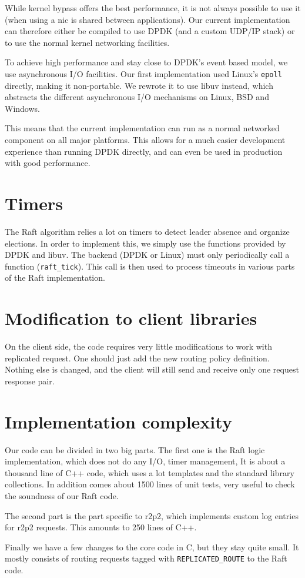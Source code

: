 While kernel bypass offers the best performance, it is not always possible to use it (\ie when using a \gls{nic} is shared between applications).
Our current implementation can therefore either be compiled to use DPDK (and a custom UDP/IP stack) or to use the normal kernel networking facilities.

To achieve high performance and stay close to DPDK's event based model, we use asynchronous I/O facilities.
Our first implementation used Linux's \texttt{epoll} directly, making it non-portable.
We rewrote it to use libuv\cite{libuv} instead, which abstracts the different asynchronous I/O mechanisms on Linux, BSD and Windows.

This means that the current implementation can run as a normal networked component on all major platforms.
This allows for a much easier development experience than running DPDK directly, and can even be used in production with good performance.

\section{Timers}

The Raft algorithm relies a lot on timers to detect leader absence and organize elections.
In order to implement this, we simply use the functions provided by DPDK and libuv.
The backend (DPDK or Linux) must only periodically call a function (\texttt{raft\_tick}).
This call is then used to process timeouts in various parts of the Raft implementation.

\section{Modification to client libraries}

On the client side, the code requires very little modifications to work with replicated request.
One should just add the new routing policy definition.
Nothing else is changed, and the client will still send and receive only one request response pair.


\section{Implementation complexity}

Our code can be divided in two big parts.
The first one is the Raft logic implementation, which does not do any I/O, timer management, \etc
It is about a thousand line of C++ code, which uses a lot templates and the standard library collections.
In addition comes about 1500 lines of unit tests, very useful to check the soundness of our Raft code.

The second part is the part specific to \gls{r2p2}, which implements custom log entries for \gls{r2p2} requests.
This amounts to 250 lines of C++.

Finally we have a few changes to the core code in C, but they stay quite small.
It mostly consists of routing requests tagged with \texttt{REPLICATED\_ROUTE} to the Raft code.
